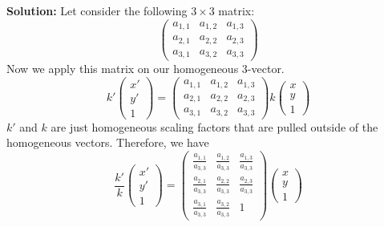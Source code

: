 \documentclass[12pt]{article}
\begin{document}
\begin{enumerate}[leftmargin=\labelsep]
\begin{enumerate}
\textbf{Solution:}
        Let consider the following $3 \times 3$ matrix:
        \begin{equation}
        \begin{pmatrix}
        a_{1,1} & a_{1,2} & a_{1,3} \\
        a_{2,1} & a_{2,2} & a_{2,3} \\
        a_{3,1} & a_{3,2} & a_{3,3}
        \end{pmatrix}
        \end{equation}
        Now we apply this matrix on our homogeneous $3$-vector.
        \begin{equation}
        k'\begin{pmatrix}
        x' \\
        y' \\
        1
        \end{pmatrix} = \begin{pmatrix}
        a_{1,1} & a_{1,2} & a_{1,3} \\
        a_{2,1} & a_{2,2} & a_{2,3} \\
        a_{3,1} & a_{3,2} & a_{3,3}
        \end{pmatrix} k \begin{pmatrix}
        x \\
        y \\
        1
        \end{pmatrix}
        \end{equation}
        $k'$ and $k$ are just homogeneous scaling factors that are pulled outside of the homogeneous vectors. Therefore, we have
         \begin{equation}
        \frac{k'}{k}\begin{pmatrix}
        x' \\
        y' \\
        1
        \end{pmatrix} = \begin{pmatrix}
        \frac{a_{1,1}}{a_{3,3}} & \frac{a_{1,2}}{a_{3,3}} & \frac{a_{1,3}}{a_{3,3}} \\
        \frac{a_{2,1}}{a_{3,3}} & \frac{a_{2,2}}{a_{3,3}} & \frac{a_{2,3}}{a_{3,3}} \\
        \frac{a_{3,1}}{a_{3,3}} & \frac{a_{3,2}}{a_{3,3}} & 1
        \end{pmatrix}\begin{pmatrix}
        x \\
        y \\
        1
        \end{pmatrix}

\end{equation}
\end{enumerate}
\end{enumerate}
\end{document}
